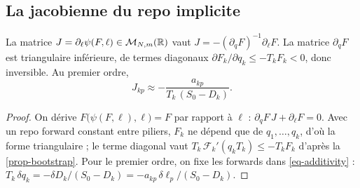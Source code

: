 \subsection{La jacobienne du repo implicite}
\begin{lemma}[Jacobienne]\label{lem-jacobian}
La matrice $J=\partial_\ell\psi(F, \ell)\in\mathcal{M}_{N,m}(\mathbb{R})$ vaut $J=-(\partial_qF)^{-1}\partial_\ell F$. La matrice
$\partial_qF$ est triangulaire inférieure, de termes diagonaux $\partial F_k/\partial q_k\le-T_kF_k<0$, donc
inversible. Au premier ordre,
\begin{equation}\label{eq-jacobian}
J_{kp}\approx-\frac{a_{kp}}{T_k\,(S_0-D_k)} .
\end{equation}
\end{lemma}
\begin{proof}
On dérive $F\bigl(\psi(F, \ell), \ell\bigr)=F$ par rapport à $\ell$ : $\partial_qF\,J+\partial_\ell F=0$. Avec un repo
forward constant entre piliers, $F_k$ ne dépend que de $q_1, \dots, q_k$, d'où la forme triangulaire ; le terme
diagonal vaut $T_k\,\mathcal F_k'(q_kT_k)\le-T_kF_k$ d'après la \cref{prop-bootstrap}. Pour le premier ordre, on fixe
les forwards dans \eqref{eq-additivity} : $T_k\,\delta q_k=-\delta D_k/(S_0-D_k)=-a_{kp}\,\delta\ell_p/(S_0-D_k)$.
\end{proof}

